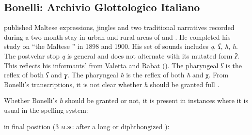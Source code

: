 \documentclass[output=paper]{langsci/langscibook}
\begin{document}
\subsection{Bonelli: Archivio Glottologico Italiano}
\citet{Bonelli1897} published Maltese  expressions, jingles and two traditional narratives recorded during a two-month stay in urban and rural areas of  and . He completed his study on “the Maltese ” in 1898 and 1900. His set of  sounds includes \textit{q}, \textit{ʕ}, \textit{ħ}, \textit{h}. The postvelar stop \textit{q} is general and does not alternate with its mutated form \textit{ʔ}. This reflects his informants'  from Valetta and Rabat (). The pharyngeal  \textit{ʕ} is the reflex of both \textit{ʕ} and \textit{ɣ}. The pharyngeal  \textit{ħ} is the reflex of both \textit{ħ} and χ. From Bonelli's transcriptions, it is not clear whether \textit{h} should be granted full .


Whether Bonelli's \textit{h} should be granted  or not, it is present in instances where it is usual in the spelling system:

 

\puechlengths{1cm}{3cm}{4.5cm}{3cm}{1.5cm}{1.5cm}
\ea%
    \label{ex:puech:14}
in final position (3 \textsc{m.sg}  after a long or diphthongized ):\\
\begin{xlist}
\end{xlist}
\z
\end{document}
